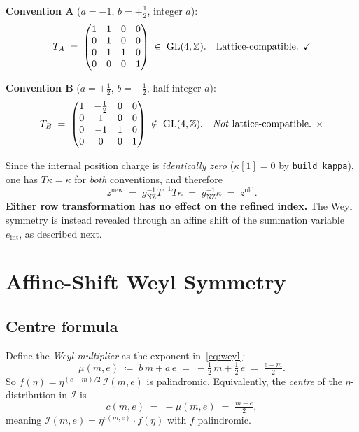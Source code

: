 \documentclass[12pt,a4paper]{article}
\newcommand{\gNZ}{g_{\mathrm{NZ}}}
\newcommand{\IRef}{\mathcal{I}}
\newcommand{\ZZ}{\mathbb{Z}}
\theoremstyle{definition}
\begin{document}
\textbf{Convention A} ($a=-1$, $b=+\tfrac12$, integer $a$):
\[
  T_A \;=\;
  \begin{pmatrix}
    1 & 1 & 0 & 0 \\
    0 & 1 & 0 & 0 \\
    0 & 1 & 1 & 0 \\
    0 & 0 & 0 & 1
  \end{pmatrix}
  \;\in\; \mathrm{GL}(4,\ZZ). \quad\text{Lattice-compatible. \checkmark}
\]

\textbf{Convention B} ($a=+\tfrac12$, $b=-\tfrac12$, half-integer $a$):
\[
  T_B \;=\;
  \begin{pmatrix}
    1 & -\tfrac12 & 0 & 0 \\
    0 &   1  & 0 & 0 \\
    0 &  -1  & 1 & 0 \\
    0 &   0  & 0 & 1
  \end{pmatrix}
  \;\notin\; \mathrm{GL}(4,\ZZ). \quad\text{\emph{Not} lattice-compatible. \texttimes}
\]

Since the internal position charge is \emph{identically zero}
($\kappa[1]=0$ by \texttt{build\_kappa}), one has $T\kappa = \kappa$
for \emph{both} conventions, and therefore
\[
  z^{\mathrm{new}} \;=\; \gNZ^{-1} T^{-1} T \kappa \;=\; \gNZ^{-1}\kappa \;=\; z^{\mathrm{old}}.
\]
\textbf{Either row transformation has no effect on the refined index.}
The Weyl symmetry is instead revealed through an affine shift of the
summation variable $e_{\mathrm{int}}$, as described next.

\section{Affine-Shift Weyl Symmetry}

\subsection{Centre formula}

Define the \emph{Weyl multiplier} as the exponent in~\eqref{eq:weyl}:
\begin{equation}\label{eq:centre}
  \mu(m,e) \;\coloneqq\; b\,m + a\,e
  \;=\; -\tfrac{1}{2}\,m + \tfrac{1}{2}\,e
  \;=\; \tfrac{e-m}{2}.
\end{equation}
So $f(\eta) = \eta^{(e-m)/2}\,\IRef(m,e)$ is palindromic.
Equivalently, the \emph{centre} of the $\eta$-distribution in $\IRef$ is
\begin{equation}
  c(m,e) \;=\; -\mu(m,e) \;=\; \tfrac{m-e}{2},
\end{equation}
meaning $\IRef(m,e) = \eta^{c(m,e)} \cdot f(\eta)$ with $f$ palindromic.
\end{document}
